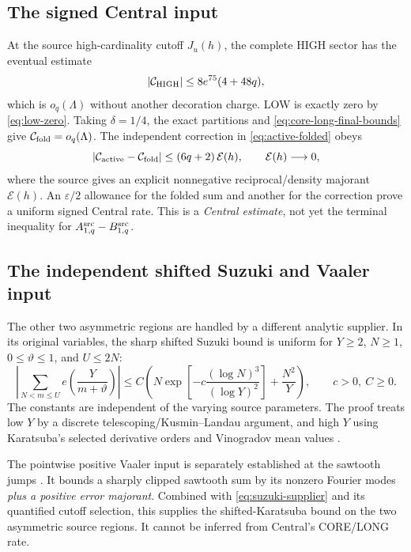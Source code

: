 \documentclass[11pt]{article}
\theoremstyle{definition}
\theoremstyle{remark}
\newcommand{\1}{\mathbf 1}
\begin{document}
\subsection{The signed Central input}

At the source high-cardinality cutoff $J_u(h)$, the complete HIGH
sector has the eventual estimate
\begin{equation}\label{eq:high-bound}
 |\mathcal C_{\rm HIGH}|\le 8e^{75}(4+48q),
\end{equation}
which is $o_q(\Lambda)$ without another decoration charge.
LOW is exactly zero by \eqref{eq:low-zero}. Taking $\delta=1/4$,
the exact partitions and \eqref{eq:core-long-final-bounds} give
$\mathcal C_{\rm fold}=o_q(\Lambda)$.
The independent correction in \eqref{eq:active-folded} obeys
\begin{equation}\label{eq:folded-error-bound}
 |\mathcal C_{\rm active}-\mathcal C_{\rm fold}|
 \le(6q+2)\,\mathcal E(h),\qquad\mathcal E(h)\longrightarrow0,
\end{equation}
where the source gives an explicit nonnegative reciprocal/density
majorant $\mathcal E(h)$. An $\varepsilon/2$ allowance for the folded
sum and another for the correction prove a uniform signed Central
rate. This is a \emph{Central estimate}, not yet the terminal
inequality for $A^{\rm src}_{1,q}-B^{\rm src}_{1,q}$.

\subsection{The independent shifted Suzuki and Vaaler input}

The other two asymmetric regions are handled by a different analytic
supplier. In its original variables, the sharp shifted Suzuki bound
is uniform for $Y\ge2$, $N\ge1$, $0\le\vartheta\le1$, and
$U\le2N$:
\begin{equation}\label{eq:suzuki-supplier}
 \left|\sum_{N<m\le U}e\!\left(\frac{Y}{m+\vartheta}\right)\right|
 \le C\left(N\exp\!\left[-c\frac{(\log N)^3}{(\log Y)^2}\right]
       +\frac{N^2}{Y}\right),\qquad c>0,\ C\ge0.
\end{equation}
The constants are independent of the varying source parameters.
The proof treats low $Y$ by a discrete telescoping/Kusmin--Landau
argument, and high $Y$ using Karatsuba's selected derivative orders
and Vinogradov mean values \cite{Karatsuba1971}.

The pointwise positive Vaaler input is separately established at the
sawtooth jumps \cite{Vaaler1985}. It bounds a sharply clipped sawtooth
sum by its nonzero Fourier modes \emph{plus a positive error
majorant}. Combined with \eqref{eq:suzuki-supplier} and its
quantified cutoff selection, this supplies the shifted-Karatsuba
bound on the two asymmetric source regions. It cannot be inferred
from Central's CORE/LONG rate.
\end{document}
